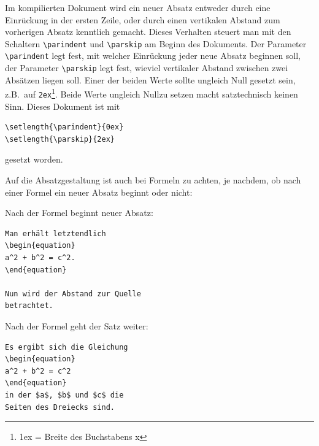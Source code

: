 \documentclass[arbeit=studie,oneside,BCOR=12mm]{ArbeitRST}
\begin{document}
Im kompilierten Dokument wird ein neuer Absatz entweder durch eine Einrückung in der ersten Zeile, oder durch einen vertikalen Abstand zum vorherigen Absatz kenntlich gemacht. Dieses Verhalten steuert man mit den Schaltern \texttt{\textbackslash parindent} und \texttt{\textbackslash parskip} am Beginn des Dokuments. Der Parameter \texttt{\textbackslash parindent} legt fest, mit welcher Einrückung jeder neue Absatz beginnen soll, der Parameter \texttt{\textbackslash parskip} legt fest, wieviel vertikaler Abstand zwischen zwei Absätzen liegen soll. Einer der beiden Werte sollte ungleich Null gesetzt sein, z.B.~auf \texttt{2ex}\footnote{1ex = Breite des Buchstabens x}. Beide Werte ungleich Nullzu setzen macht satztechnisch keinen Sinn. Dieses Dokument ist mit
\begin{verbatim}
\setlength{\parindent}{0ex}
\setlength{\parskip}{2ex}
\end{verbatim}
gesetzt worden.

Auf die Absatzgestaltung ist auch bei Formeln zu achten, je nachdem, ob nach einer Formel ein neuer Absatz beginnt oder nicht:

\begin{minipage}[t]{0.45\linewidth}
Nach der Formel beginnt neuer Absatz:
\begin{verbatim}
Man erhält letztendlich
\begin{equation}
a^2 + b^2 = c^2.
\end{equation}

Nun wird der Abstand zur Quelle
betrachtet.
\end{verbatim}
\end{minipage}
\hfill
\begin{minipage}[t]{0.45\linewidth}
Nach der Formel geht der Satz weiter:
\begin{verbatim}
Es ergibt sich die Gleichung
\begin{equation}
a^2 + b^2 = c^2
\end{equation}
in der $a$, $b$ und $c$ die
Seiten des Dreiecks sind.
\end{verbatim}
\end{minipage}


\end{document}

